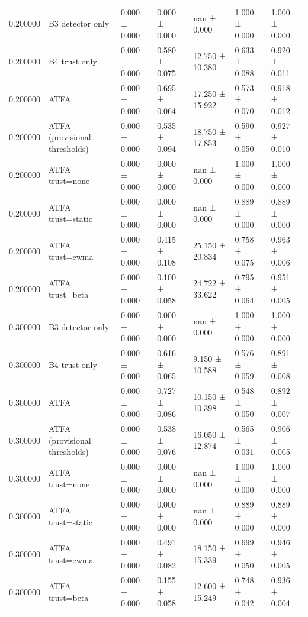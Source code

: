 \begin{tabular}{rllllll}
0.200000 & B3 detector only & 0.000 ± 0.000 & 0.000 ± 0.000 & nan ± 0.000 & 1.000 ± 0.000 & 1.000 ± 0.000 \\
0.200000 & B4 trust only & 0.000 ± 0.000 & 0.580 ± 0.075 & 12.750 ± 10.380 & 0.633 ± 0.088 & 0.920 ± 0.011 \\
0.200000 & ATFA & 0.000 ± 0.000 & 0.695 ± 0.064 & 17.250 ± 15.922 & 0.573 ± 0.070 & 0.918 ± 0.012 \\
0.200000 & ATFA (provisional thresholds) & 0.000 ± 0.000 & 0.535 ± 0.094 & 18.750 ± 17.853 & 0.590 ± 0.050 & 0.927 ± 0.010 \\
0.200000 & ATFA trust=none & 0.000 ± 0.000 & 0.000 ± 0.000 & nan ± 0.000 & 1.000 ± 0.000 & 1.000 ± 0.000 \\
0.200000 & ATFA trust=static & 0.000 ± 0.000 & 0.000 ± 0.000 & nan ± 0.000 & 0.889 ± 0.000 & 0.889 ± 0.000 \\
0.200000 & ATFA trust=ewma & 0.000 ± 0.000 & 0.415 ± 0.108 & 25.150 ± 20.834 & 0.758 ± 0.075 & 0.963 ± 0.006 \\
0.200000 & ATFA trust=beta & 0.000 ± 0.000 & 0.100 ± 0.058 & 24.722 ± 33.622 & 0.795 ± 0.064 & 0.951 ± 0.005 \\
0.300000 & B3 detector only & 0.000 ± 0.000 & 0.000 ± 0.000 & nan ± 0.000 & 1.000 ± 0.000 & 1.000 ± 0.000 \\
0.300000 & B4 trust only & 0.000 ± 0.000 & 0.616 ± 0.065 & 9.150 ± 10.588 & 0.576 ± 0.059 & 0.891 ± 0.008 \\
0.300000 & ATFA & 0.000 ± 0.000 & 0.727 ± 0.086 & 10.150 ± 10.398 & 0.548 ± 0.050 & 0.892 ± 0.007 \\
0.300000 & ATFA (provisional thresholds) & 0.000 ± 0.000 & 0.538 ± 0.076 & 16.050 ± 12.874 & 0.565 ± 0.031 & 0.906 ± 0.005 \\
0.300000 & ATFA trust=none & 0.000 ± 0.000 & 0.000 ± 0.000 & nan ± 0.000 & 1.000 ± 0.000 & 1.000 ± 0.000 \\
0.300000 & ATFA trust=static & 0.000 ± 0.000 & 0.000 ± 0.000 & nan ± 0.000 & 0.889 ± 0.000 & 0.889 ± 0.000 \\
0.300000 & ATFA trust=ewma & 0.000 ± 0.000 & 0.491 ± 0.082 & 18.150 ± 15.339 & 0.699 ± 0.050 & 0.946 ± 0.005 \\
0.300000 & ATFA trust=beta & 0.000 ± 0.000 & 0.155 ± 0.058 & 12.600 ± 15.249 & 0.748 ± 0.042 & 0.936 ± 0.004 \\
\bottomrule
\end{tabular}
